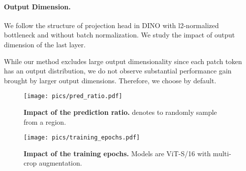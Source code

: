 \documentclass{article} \usepackage{iclr2022_conference,times}
\begin{document}
\paragraph{Output Dimension.} 
We follow the structure of projection head in DINO with l2-normalized bottleneck and without batch normalization. We study the impact of output dimension  of the last layer. 
\vspace{-0.3cm}
\begin{table}[H]
\centering
{}
\end{table}
\vspace{-0.7cm}
While our method excludes large output dimensionality since each patch token has an output distribution, we do not observe substantial performance gain brought by larger output dimensions. Therefore, we choose  by default.

\begin{figure}[!tbp]
\begin{minipage}[c]{.5\linewidth}
\centering
\texttt{[image: pics/pred\_ratio.pdf]}
\vspace{-0.2cm}
\captionsetup{width=.9\linewidth}
\caption{\textbf{Impact of the prediction ratio.}  denotes to randomly sample from a region.}
\vspace{-0.2cm}
\label{fig:predratio}
\end{minipage}\begin{minipage}[c]{.5\linewidth}
\centering
\texttt{[image: pics/training\_epochs.pdf]}
\vspace{-0.2cm}
\captionsetup{width=.9\linewidth}
\caption{\textbf{Impact of the training epochs.} Models are ViT-S/16 with multi-crop augmentation.}
\vspace{-0.1cm}
\label{fig:trainepochs}
\end{minipage}
\vspace{-0.2cm}
\end{figure}
\end{document}
